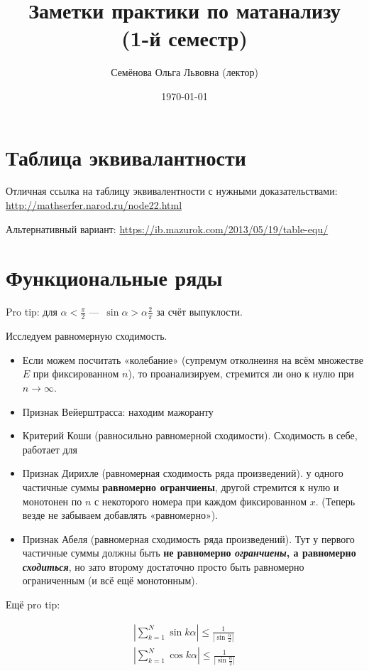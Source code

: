 \documentclass[12pt, a4paper]{article}
\title{Заметки практики по матанализу \\(1-й семестр)}
\author{
  \vova
  \and
  {Семёнова Ольга Львовна (лектор)}
}
\date{\today}
\begin{document}
  \tittoc

  \section{Таблица эквивалантности}
  Отличная ссылка на таблицу эквивалентности с нужными доказательствами: 
  \url{http://mathserfer.narod.ru/node22.html}

  Альтернативный вариант:
  \url{https://ib.mazurok.com/2013/05/19/table-equ/} 


\section{Функциональные ряды}

Pro tip: для $\alpha < \frac{\pi}{2}$ — $\sin \alpha > \alpha \frac{2}{\pi}$ за счёт выпуклости.

Исследуем равномерную сходимость.

\begin{itemize}
	\item Если можем посчитать «колебание» (супремум отколнеиня на всём множестве $E$ при фиксированном $n$), то проанализируем, стремится ли оно к нулю при $n \to \infty$.
	\item Признак Вейерштрасса: находим мажоранту
	\item Критерий Коши (равносильно равномерной сходимости). Сходимость в себе, работает для
	\item Признак Дирихле (равномерная сходимость ряда произведений). у одного частичные суммы \textbf{равномерно огранчиены}, другой стремится к нулю и монотонен по $n$ с некоторого номера при каждом фиксированном $x$. 
  (Теперь везде не забываем добавлять «равномерно»).
  \item Признак Абеля (равномерная сходимость ряда произведений). Тут у первого частичные суммы должны быть \textbf{не равномерно \textit{огранчиены}, а равномерно \textit{сходиться}}, 
  но зато второму достаточно просто быть равномерно ограниченным (и всё ещё монотонным).
\end{itemize}

Ещё pro tip: 

\begin{equation}
  \begin{gather}
    \left| \sum_{k = 1}^N \sin {k\alpha} \right| \leqslant \frac{1}{\left| \sin {\frac{\alpha}{2}} \right|} \\
    \left| \sum_{k = 1}^N \cos {k\alpha} \right| \leqslant \frac{1}{\left| \sin {\frac{\alpha}{2}} \right|}
  \end{gather}
\end{equation}
\end{document}
